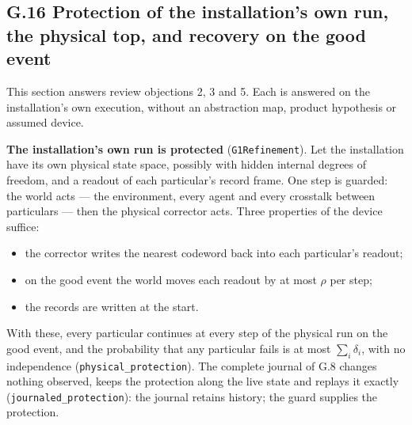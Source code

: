 \documentclass[
]{article}
\providecommand{\tightlist}{%
  \setlength{\itemsep}{0pt}\setlength{\parskip}{0pt}}
\begin{document}
\subsection{G.16 Protection of the installation's own run, the physical
top, and recovery on the good
event}\label{g.16-protection-of-the-installations-own-run-the-physical-top-and-recovery-on-the-good-event}

This section answers review objections 2, 3 and 5. Each is answered on
the installation's own execution, without an abstraction map, product
hypothesis or assumed device.

\textbf{The installation's own run is protected}
(\texttt{G1Refinement}). Let the installation have its own physical
state space, possibly with hidden internal degrees of freedom, and a
readout of each particular's record frame. One step is guarded: the
world acts --- the environment, every agent and every crosstalk between
particulars --- then the physical corrector acts. Three properties of
the device suffice:

\begin{itemize}
\tightlist
\item
  the corrector writes the nearest codeword back into each particular's
  readout;
\item
  on the good event the world moves each readout by at most \(\rho\) per
  step;
\item
  the records are written at the start.
\end{itemize}

With these, every particular continues at every step of the physical run
on the good event, and the probability that any particular fails is at
most \(\sum_i\delta_i\), with no independence
(\texttt{p\allowbreak{}h\allowbreak{}y\allowbreak{}s\allowbreak{}i\allowbreak{}c\allowbreak{}a\allowbreak{}l\allowbreak{}\_\allowbreak{}p\allowbreak{}r\allowbreak{}o\allowbreak{}t\allowbreak{}e\allowbreak{}c\allowbreak{}t\allowbreak{}i\allowbreak{}o\allowbreak{}n}).
The complete journal of G.8 changes nothing observed, keeps the
protection along the live state and replays it exactly
(\texttt{j\allowbreak{}o\allowbreak{}u\allowbreak{}r\allowbreak{}n\allowbreak{}a\allowbreak{}l\allowbreak{}e\allowbreak{}d\allowbreak{}\_\allowbreak{}p\allowbreak{}r\allowbreak{}o\allowbreak{}t\allowbreak{}e\allowbreak{}c\allowbreak{}t\allowbreak{}i\allowbreak{}o\allowbreak{}n}):
the journal retains history; the guard supplies the protection.
\end{document}
